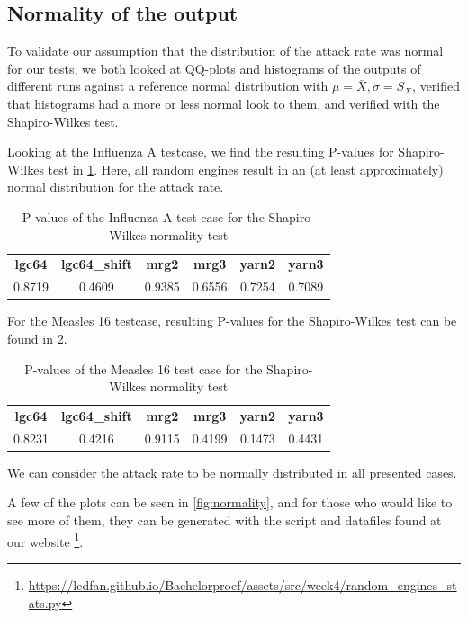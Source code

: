 \documentclass{acmart}
\begin{document}
\subsection{Normality of the output}
\label{par:normality}
To validate our assumption that the distribution of the attack rate was normal for our tests, we both looked at QQ-plots and histograms of the outputs of different runs against a reference normal distribution with $\mu = \bar{X}, \sigma=S_X$, verified that histograms had a more or less normal look to them, and verified with the Shapiro-Wilkes test.

Looking at the Influenza A testcase, we find the resulting P-values for Shapiro-Wilkes test in \cref{tab:influenza_a:shapiro}. Here, all random engines result in an (at least approximately) normal distribution for the attack rate.
\begin{table}[!hbt]
    \begin{tabular}{c c c c c c}
       \textbf{lgc64} & \textbf{lgc64\_shift} & \textbf{mrg2} & \textbf{mrg3} & \textbf{yarn2} & \textbf{yarn3}\\
        0.8719 & 0.4609 & 0.9385 & 0.6556 & 0.7254 & 0.7089
    \end{tabular}
    \caption{P-values of the Influenza A test case for the Shapiro-Wilkes normality test}
    \label{tab:influenza_a:shapiro}
\end{table}


For the Measles 16 testcase, resulting P-values for the Shapiro-Wilkes test can be found in \cref{tab:measles_16:shapiro}.

\begin{table}[!hbt]
    \begin{tabular}{c c c c c c}
       \textbf{lgc64} & \textbf{lgc64\_shift} & \textbf{mrg2} & \textbf{mrg3} & \textbf{yarn2} & \textbf{yarn3}\\
        0.8231 & 0.4216 & 0.9115 & 0.4199 & 0.1473 & 0.4431
    \end{tabular}
    \caption{P-values of the Measles 16 test case for the Shapiro-Wilkes normality test}
    \label{tab:measles_16:shapiro}
\end{table}

We can consider the attack rate to be normally distributed in all presented cases.

A few of the plots can be seen in \cref{fig:normality}, and for those who would like to see more of them, they can be generated with the script and datafiles found at our website \footnote{\url{https://ledfan.github.io/Bachelorproef/assets/src/week4/random\_engines\_stats.py}}.
\end{document}

